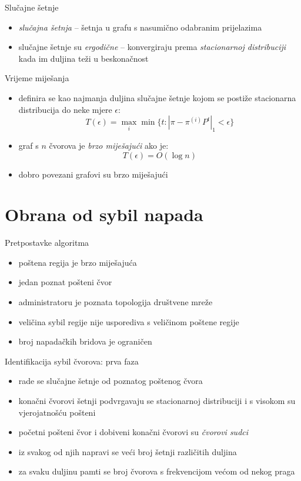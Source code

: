 \documentclass{beamer}
\begin{document}
\begin{frame}{Slučajne šetnje}
  \begin{itemize}
    \item \textit{slučajna šetnja} -- šetnja u grafu s nasumično odabranim prijelazima
    \item slučajne šetnje su \textit{ergodične} -- konvergiraju prema \textit{stacionarnoj distribuciji} kada im duljina teži u beskonačnost
  \end{itemize}
\end{frame}

\begin{frame}{Vrijeme miješanja}
  \begin{itemize}
    \item definira se kao najmanja duljina slučajne šetnje kojom se postiže stacionarna distribucija do neke mjere $\epsilon$:
      \[ T(\epsilon) = \max_{i} \min \{t : |\pi - \pi^{(i)} P^t|_1 < \epsilon\} \]
    \item graf s $n$ čvorova je \textit{brzo miješajući} ako je:
      \[ T(\epsilon) = O(\log n) \]
    \item dobro povezani grafovi su brzo miješajući
  \end{itemize}
\end{frame}

\section{Obrana od sybil napada}

\begin{frame}{Pretpostavke algoritma}
  \begin{itemize}
    \item poštena regija je brzo miješajuća
    \item jedan poznat pošteni čvor
    \item administratoru je poznata topologija društvene mreže
    \item veličina sybil regije nije usporediva s veličinom poštene regije
    \item broj napadačkih bridova je ograničen
  \end{itemize}
\end{frame}

\begin{frame}{Identifikacija sybil čvorova: prva faza}
  \begin{itemize}
    \item rade se slučajne šetnje od poznatog poštenog čvora
    \item konačni čvorovi šetnji podvrgavaju se stacionarnoj distribuciji i s visokom su vjerojatnošću pošteni
    \item početni pošteni čvor i dobiveni konačni čvorovi su \textit{čvorovi sudci}
    \item iz svakog od njih napravi se veći broj šetnji različitih duljina
    \item za svaku duljinu pamti se broj čvorova s frekvencijom većom od nekog praga
  \end{itemize}
\end{frame}
\end{document}
